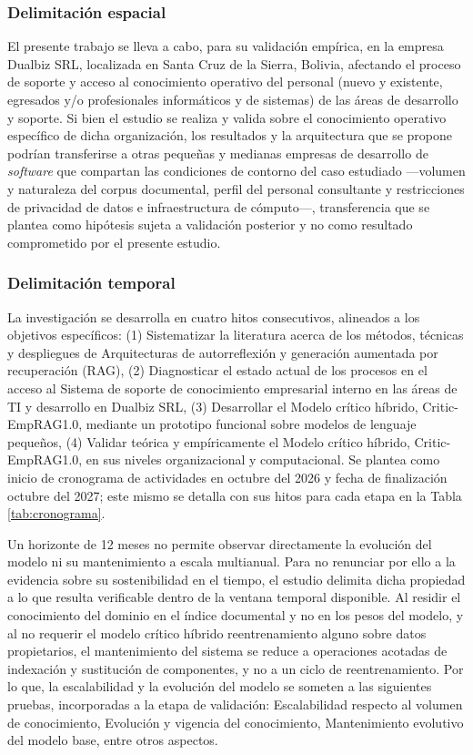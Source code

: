 \subsubsection*{Delimitación espacial}

El presente trabajo se lleva a cabo, para su validación empírica, en la empresa Dualbiz SRL, localizada en Santa Cruz de la Sierra, Bolivia, afectando el proceso de soporte y acceso al conocimiento operativo del personal (nuevo y existente, egresados y/o profesionales informáticos y de sistemas) de las áreas de desarrollo y soporte. Si bien el estudio se realiza y valida sobre el conocimiento operativo específico de dicha organización, los resultados y la arquitectura que se propone podrían transferirse a otras pequeñas y medianas empresas de desarrollo de \textit{software} que compartan las condiciones de contorno del caso estudiado ---volumen y naturaleza del corpus documental, perfil del personal consultante y restricciones de privacidad de datos e infraestructura de cómputo---, transferencia que se plantea como hipótesis sujeta a validación posterior y no como resultado comprometido por el presente estudio.

\subsubsection*{Delimitación temporal}

La investigación se desarrolla en cuatro hitos consecutivos, alineados a los objetivos específicos: (1) Sistematizar la literatura acerca de los métodos, técnicas y despliegues de Arquitecturas de autorreflexión y generación aumentada por recuperación (RAG), (2) Diagnosticar el estado actual de los procesos en el acceso al Sistema de soporte de conocimiento empresarial interno en las áreas de TI y desarrollo en Dualbiz SRL, (3) Desarrollar el Modelo crítico híbrido, Critic-EmpRAG1.0, mediante un prototipo funcional sobre modelos de lenguaje pequeños, (4) Validar teórica y empíricamente el Modelo crítico híbrido, Critic-EmpRAG1.0, en sus niveles organizacional y computacional. Se plantea como inicio de cronograma de actividades en octubre del 2026 y fecha de finalización octubre del 2027; este mismo se detalla con sus hitos para cada etapa en la Tabla \ref{tab:cronograma}.

Un horizonte de 12 meses no permite observar directamente la evolución del modelo ni su mantenimiento a escala multianual. Para no renunciar por ello a la evidencia sobre su sostenibilidad en el tiempo, el estudio delimita dicha propiedad a lo que resulta verificable dentro de la ventana temporal disponible. Al residir el conocimiento del dominio en el índice documental y no en los pesos del modelo, y al no requerir el modelo crítico híbrido reentrenamiento alguno sobre datos propietarios, el mantenimiento del sistema se reduce a operaciones acotadas de indexación y sustitución de componentes, y no a un ciclo de reentrenamiento. Por lo que, la escalabilidad y la evolución del modelo se someten a las siguientes pruebas, incorporadas a la etapa de validación: Escalabilidad respecto al volumen de conocimiento, Evolución y vigencia del conocimiento, Mantenimiento evolutivo del modelo base, entre otros aspectos.


